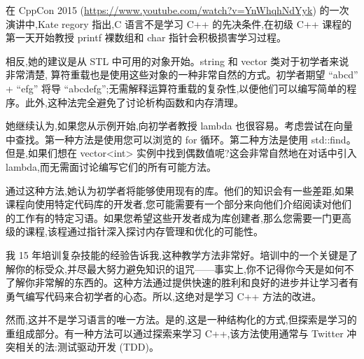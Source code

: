 在 CppCon 2015 (\url{https://www.youtube.com/watch?v=YnWhqhNdYyk}) 的一次演讲中,Kate regory 指出,C 语言不是学习 C++ 的先决条件,在初级 C++ 课程的第一天开始教授 printf 裸数组和 char 指针会积极损害学习过程。

相反,她的建议是从 STL 中可用的对象开始。string 和 vector 类对于初学者来说非常清楚, 算符重载也是使用这些对象的一种非常自然的方式。初学者期望 “abcd” + “efg” 将导 “abcdefg”;无需解释运算符重载的复杂性,以便他们可以编写简单的程序。此外,这种法完全避免了讨论析构函数和内存清理。

她继续认为,如果您从示例开始,向初学者教授 lambda 也很容易。考虑尝试在向量中查找。第一种方法是使用您可以浏览的 for 循环。第二种方法是使用 std::find。但是,如果们想在 vector<int> 实例中找到偶数值呢?这会非常自然地在对话中引入 lambda,而无需面讨论编写它们的所有可能方法。

通过这种方法,她认为初学者将能够使用现有的库。他们的知识会有一些差距,如果课程向使用特定代码库的开发者,您可能需要有一个部分来向他们介绍阅读对他们的工作有的特定习语。如果您希望这些开发者成为库创建者,那么您需要一门更高级的课程,该程通过指针深入探讨内存管理和优化的可能性。

我 15 年培训复杂技能的经验告诉我,这种教学方法非常好。培训中的一个关键是了解你的标受众,并尽最大努力避免知识的诅咒——事实上,你不记得你今天是如何不了解你非常解的东西的。这种方法通过提供快速的胜利和良好的进步并让学习者有勇气编写代码来合初学者的心态。所以,这绝对是学习 C++ 方法的改进。

然而,这并不是学习语言的唯一方法。是的,这是一种结构化的方式,但探索是学习的重组成部分。有一种方法可以通过探索来学习 C++,该方法使用通常与 Twitter 冲突相关的法:测试驱动开发 (TDD)。